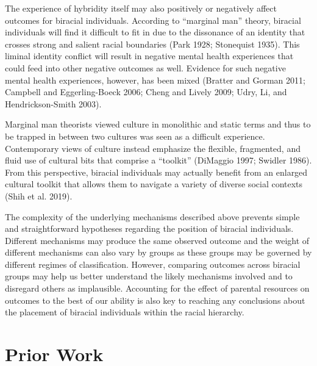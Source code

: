 \documentclass[
  letterpaper,
  DIV=11,
  numbers=noendperiod]{scrartcl}
\begin{document}
The experience of hybridity itself may also positively or negatively
affect outcomes for biracial individuals. According to ``marginal man''
theory, biracial individuals will find it difficult to fit in due to the
dissonance of an identity that crosses strong and salient racial
boundaries (Park 1928; Stonequist 1935). This liminal identity conflict
will result in negative mental health experiences that could feed into
other negative outcomes as well. Evidence for such negative mental
health experiences, however, has been mixed (Bratter and Gorman 2011;
Campbell and Eggerling-Boeck 2006; Cheng and Lively 2009; Udry, Li, and
Hendrickson-Smith 2003).

Marginal man theorists viewed culture in monolithic and static terms and
thus to be trapped in between two cultures was seen as a difficult
experience. Contemporary views of culture instead emphasize the
flexible, fragmented, and fluid use of cultural bits that comprise a
``toolkit'' (DiMaggio 1997; Swidler 1986). From this perspective,
biracial individuals may actually benefit from an enlarged cultural
toolkit that allows them to navigate a variety of diverse social
contexts (Shih et al. 2019).

The complexity of the underlying mechanisms described above prevents
simple and straightforward hypotheses regarding the position of biracial
individuals. Different mechanisms may produce the same observed outcome
and the weight of different mechanisms can also vary by groups as these
groups may be governed by different regimes of classification. However,
comparing outcomes across biracial groups may help us better understand
the likely mechanisms involved and to disregard others as implausible.
Accounting for the effect of parental resources on outcomes to the best
of our ability is also key to reaching any conclusions about the
placement of biracial individuals within the racial hierarchy.

\hypertarget{prior-work}{%
\section{Prior Work}\label{prior-work}}
\end{document}
